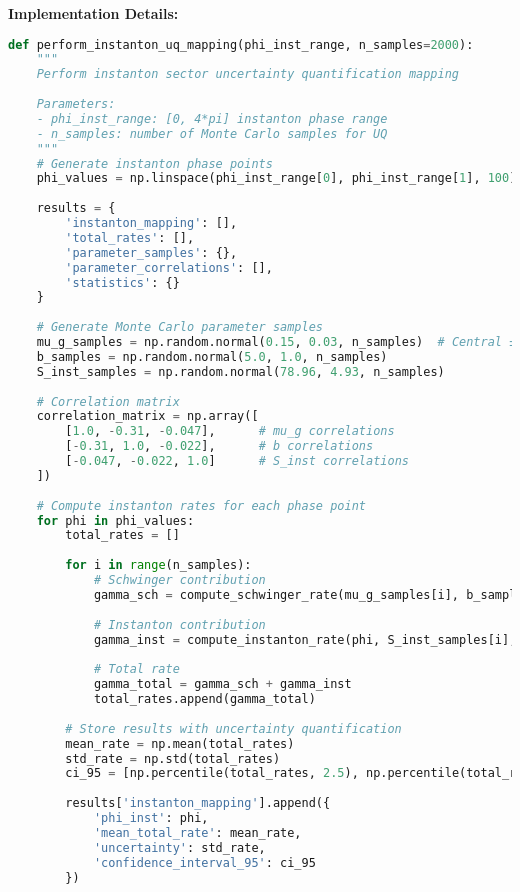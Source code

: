 \documentclass[11pt]{article}
\begin{document}
\textbf{Implementation Details:}
\begin{lstlisting}[language=Python, caption=Instanton Sector UQ Mapping]
def perform_instanton_uq_mapping(phi_inst_range, n_samples=2000):
    """
    Perform instanton sector uncertainty quantification mapping
    
    Parameters:
    - phi_inst_range: [0, 4*pi] instanton phase range
    - n_samples: number of Monte Carlo samples for UQ
    """
    # Generate instanton phase points
    phi_values = np.linspace(phi_inst_range[0], phi_inst_range[1], 100)
    
    results = {
        'instanton_mapping': [],
        'total_rates': [],
        'parameter_samples': {},
        'parameter_correlations': [],
        'statistics': {}
    }
    
    # Generate Monte Carlo parameter samples
    mu_g_samples = np.random.normal(0.15, 0.03, n_samples)  # Central ± uncertainty
    b_samples = np.random.normal(5.0, 1.0, n_samples)
    S_inst_samples = np.random.normal(78.96, 4.93, n_samples)
    
    # Correlation matrix
    correlation_matrix = np.array([
        [1.0, -0.31, -0.047],      # mu_g correlations
        [-0.31, 1.0, -0.022],      # b correlations  
        [-0.047, -0.022, 1.0]      # S_inst correlations
    ])
    
    # Compute instanton rates for each phase point
    for phi in phi_values:
        total_rates = []
        
        for i in range(n_samples):
            # Schwinger contribution
            gamma_sch = compute_schwinger_rate(mu_g_samples[i], b_samples[i])
            
            # Instanton contribution
            gamma_inst = compute_instanton_rate(phi, S_inst_samples[i], mu_g_samples[i])
            
            # Total rate
            gamma_total = gamma_sch + gamma_inst
            total_rates.append(gamma_total)
        
        # Store results with uncertainty quantification
        mean_rate = np.mean(total_rates)
        std_rate = np.std(total_rates)
        ci_95 = [np.percentile(total_rates, 2.5), np.percentile(total_rates, 97.5)]
        
        results['instanton_mapping'].append({
            'phi_inst': phi,
            'mean_total_rate': mean_rate,
            'uncertainty': std_rate,
            'confidence_interval_95': ci_95
        })
    

\end{lstlisting}
\end{document}
